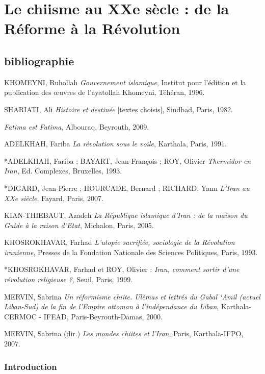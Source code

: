 \chapter{Le chiisme au XXe sècle : de la Réforme à la Révolution}

\section{bibliographie}



 
 
 
  KHOMEYNI, Ruhollah \emph{Gouvernement islamique}, Institut pour
  l'édition et la publication des œuvres de l'ayatollah Khomeyni,
  Téhéran, 1996.
 
 
 
  SHARIATI, Ali \emph{Histoire et destinée} {[}textes choisis{]},
  Sindbad, Paris, 1982.
 

 
\emph{Fatima est Fatima}, Albouraq, Beyrouth, 2009.

ADELKHAH, Fariba \emph{La révolution sous le voile}, Karthala, Paris,
1991.

*ADELKHAH, Fariba ; BAYART, Jean-François ; ROY, Olivier \emph{Thermidor
en Iran}, Ed. Complexes, Bruxelles, 1993.

*DIGARD, Jean-Pierre ; HOURCADE, Bernard ; RICHARD, Yann \emph{L'Iran au
XXe siècle}, Fayard, Paris, 2007.

KIAN-THIEBAUT, Azadeh \emph{La République islamique d'Iran : de la
maison du Guide à la raison d'Etat}, Michalon, Paris, 2005.

KHOSROKHAVAR, Farhad \emph{L'utopie sacrifiée, sociologie de la
Révolution iranienne}, Presses de la Fondation Nationale des Sciences
Politiques, Paris, 1993.

*KHOSROKHAVAR, Farhad et ROY, Olivier : \emph{Iran, comment sortir d'une
révolution religieuse ?}, Seuil, Paris, 1999.

MERVIN, Sabrina \emph{Un réformisme chiite. Ulémas et lettrés du Gabal
`Amil (actuel Liban-Sud) de la fin de l'Empire ottoman à l'indépendance
du Liban}, Karthala-CERMOC - IFEAD, Paris-Beyrouth-Damas, 2000.

MERVIN, Sabrina (dir.) \emph{Les mondes chiites et l'Iran}, Paris,
Karthala-IFPO, 2007.
 


\subsection{Introduction}

